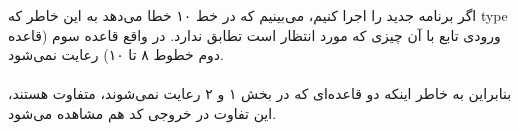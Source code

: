 \begin{prooftree}
\end{prooftree}
\begin{prooftree}
\end{prooftree}
اگر برنامه جدید را اجرا کنیم، می‌بینیم که در خط  ۱۰ خطا می‌دهد به این خاطر که type ورودی تابع با آن چیزی که مورد انتظار است تطابق ندارد. در واقع قاعده سوم (قاعده دوم خطوط ۸ تا ۱۰) رعایت نمی‌شود.
\\
\\
بنابراین به خاطر اینکه دو قاعده‌ای که در بخش ۱ و ۲ رعایت نمی‌شوند، متفاوت هستند، این تفاوت در خروجی کد هم مشاهده می‌شود.
